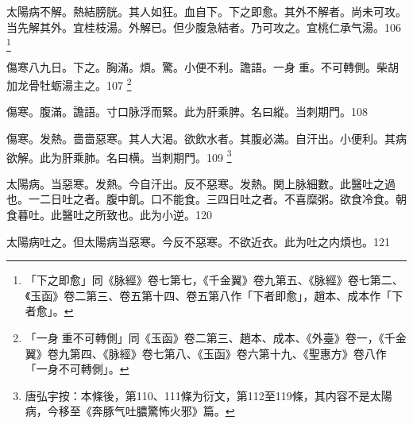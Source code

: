 太陽病不解。熱結膀胱。其人如狂。血自下。下之即愈。其外不解者。尚未可攻。当先解其外。{\khaaitp 宜桂枝湯。}外解已。{\khaaitp 但}少腹急結者。乃可攻之。宜桃仁承气湯。106
	\footnote{
		「下之即愈」同《脉經》卷七第七，《千金翼》卷九第五、《脉經》卷七第二、《玉函》卷二第三、卷五第十四、卷五第八作「下者即愈」，趙本、成本作「下者愈」。
	}

傷寒八九日。下之。胸滿。煩。驚。小便不利。譫語。一身{\khaaitpii 𥁞}{\khaaitp 重。}不可轉側。柴胡加龙骨牡蛎湯主之。107
	\footnote{
		「一身{\sungtpii 𥁞}重不可轉側」同《玉函》卷二第三、趙本、成本、《外臺》卷一，《千金翼》卷九第四、《脉經》卷七第八、《玉函》卷六第十九、《聖惠方》卷八作「一身不可轉側」。
	}

傷寒。腹滿。譫語。寸口脉浮而緊。此为肝乘脾。名曰縱。当刺期門。108

傷寒。发熱。嗇嗇惡寒。其人大渴。欲飲水者。其腹必滿。自汗出。小便利。其病欲解。此为肝乘肺。名曰横。当刺期門。109
	\footnote{
		唐弘宇按：本條後，第110、111條为衍文，第112至119條，其内容不是太陽病，今移至《奔豚气吐膿驚怖火邪》篇。
	}

%
%
%	
%
%
%
%
%
%
%
%

太陽病。当惡寒。发熱。今自汗出。反不惡寒。发熱。関上脉細數。此醫吐之過也。一二日吐之者。腹中飢。口不能食。三四日吐之者。不喜糜粥。欲食冷食。朝食暮吐。此醫吐之所致也。此为小逆。120

太陽病吐之。但太陽病当惡寒。今反不惡寒。不欲近衣。此为吐之内煩也。121

